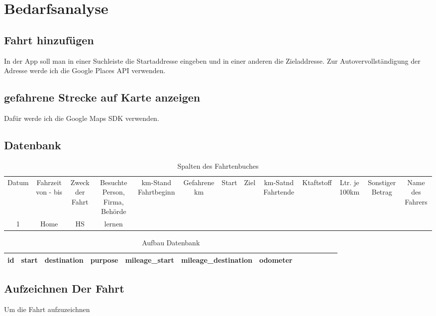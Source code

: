 \documentclass[a4paper]{article}
\begin{document}


\section{Bedarfsanalyse}

\subsection{Fahrt hinzufügen}
In der App soll man in einer Suchleiste die Startaddresse eingeben und in einer anderen die Zieladdresse.
Zur Autovervollständigung der Adresse werde ich die Google Places API verwenden.

\subsection{gefahrene Strecke auf Karte anzeigen}
Dafür werde ich die Google Maps SDK verwenden.

\subsection{Datenbank}

 \begin{table}
	\caption{Spalten des Fahrtenbuches}
    \centering
	\begin{tabular}{c c c c c c c c c c c c c}
		\hline
		Datum & Fahrzeit von - bis & Zweck der Fahrt  & Besuchte Person, Firma, Behörde &
		km-Stand Fahrtbeginn & Gefahrene km & Start & Ziel & km-Satnd Fahrtende & Ktaftstoff &
		Ltr. je 100km & Sonstiger Betrag & Name des Fahrers\\ [0.5ex]
		1 & Home & HS & lernen \\ [1ex]
		\hline
	\end{tabular}
	\label{table:nonlin}
 \end{table}

 \begin{table}
	\caption{Aufbau Datenbank}
    \centering
	\begin{tabular}{c c c c c c c c c c c c c}
		\hline
        id & start & destination & purpose & mileage_start & mileage_destination & odometer \\ [1ex]
		\hline
	\end{tabular}
	\label{table:nonlin}
 \end{table}

\subsection{Aufzeichnen Der Fahrt}
Um die Fahrt aufzuzeichnen
\end{document}
